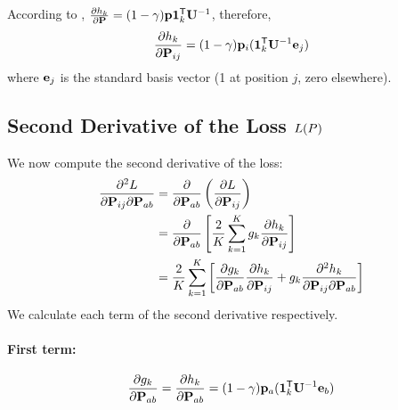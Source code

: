 According to ,
$\frac{\partial h_k}{\partial \mathbf{{P}}} = (1- \gamma )\mathbf{{p}} \mathbf{{1}}_{k}^{\mathsf{T} }\mathbf{{U}}^{-1}$,
therefore,
\begin{equation*}
\frac{\partial h_k}{\partial \mathbf{{P}}_{ij}} = (1-\gamma) \mathbf{{p}}_i (\mathbf{{1}}_{k}^{\mathsf{T}} \mathbf{{U}}^{-1} \mathbf{{e}}_j)
\end{equation*}
where $\mathbf{{e}}_j$ is the standard basis vector (1 at position $j$, zero elsewhere).



\subsection{Second Derivative of the Loss $L(P)$}

We now compute the second derivative of the loss:
\begin{align*}
\frac{\partial^2 L}{\partial \mathbf{{P}}_{ij} \partial \mathbf{{P}}_{ab}}
&= \frac{\partial}{\partial \mathbf{{P}}_{ab}} \left( \frac{\partial L}{\partial \mathbf{{P}}_{ij}} \right) \\
&= \frac{\partial}{\partial \mathbf{{P}}_{ab}} \left[ \frac{2}{K} \sum_{k=1}^K g_k \frac{\partial h_k}{\partial \mathbf{{P}}_{ij}} \right] \\
&= \frac{2}{K} \sum_{k=1}^K \left[
    \frac{\partial g_k}{\partial \mathbf{{P}}_{ab}} \frac{\partial h_k}{\partial \mathbf{{P}}_{ij}}
    + g_k \frac{\partial^2 h_k}{\partial \mathbf{{P}}_{ij} \partial \mathbf{{P}}_{ab}}
\right]
\end{align*}
We calculate each term of the second derivative respectively.
\paragraph{First term:}
\[
\frac{\partial g_k}{\partial \mathbf{{P}}_{ab}} = \frac{\partial h_k}{\partial \mathbf{{P}}_{ab}} = (1-\gamma) \mathbf{{p}}_a (\mathbf{{1}}_{k}^{\mathsf{T}} \mathbf{{U}}^{-1} \mathbf{{e}}_b)
\]

